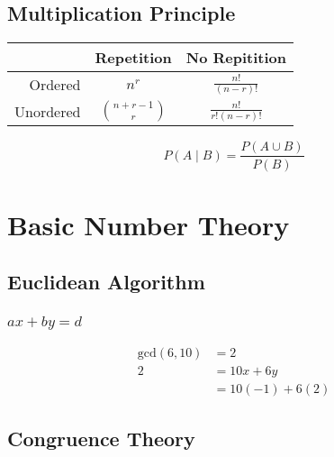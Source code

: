 \documentclass{article}
\begin{document}
\small
\begin{multicols*}{2}
    \subsection*{Multiplication Principle}

    \begin{tabular}{|r|c|c|}
        \hline
                  & Repetition           & No Repitition           \\
        \hline
        Ordered   & \(n^r\)              & \(\frac{n!}{(n-r)!}\)   \\
        Unordered & \(\binom{n+r-1}{r}\) & \(\frac{n!}{r!(n-r)!}\) \\
        \hline
    \end{tabular}
    \begin{equation*}
        P(A \mid B) = \frac{P(A \cup B)}{P(B)}
    \end{equation*}

    \section*{Basic Number Theory}
    \subsection*{Euclidean Algorithm}
    \subsubsection*{\(ax +by = d\)}
    \begin{align*}
        \text{gcd}(6, 10) & = 2             \\
        2                 & = 10x + 6y      \\
                          & = 10(-1) + 6(2)
    \end{align*}
    \subsection*{Congruence Theory}

\end{multicols*}
\end{document}
